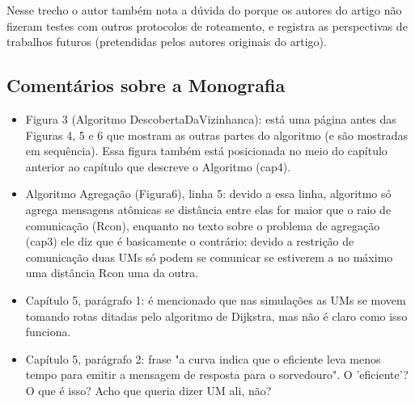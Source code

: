 Nesse trecho o autor também nota a dúvida do porque os autores do artigo não fizeram testes
com outros protocolos de roteamento, e registra as perspectivas de trabalhos futuros (pretendidas
pelos autores originais do artigo).

\subsection{Comentários sobre a Monografia}
\begin{itemize}
  \item Figura 3 (Algoritmo DescobertaDaVizinhanca): está uma página antes das Figuras 4, 5 e 6
que mostram as outras partes do algoritmo (e são mostradas em sequência). Essa figura
também está posicionada no meio do capítulo anterior ao capítulo que descreve o Algoritmo (cap4).

  \item Algoritmo Agregação (Figura6), linha 5: devido a essa linha, algoritmo só agrega mensagens
atômicas se distância entre elas for maior que o raio de comunicação (Rcon), enquanto no texto
sobre o problema de agregação (cap3) ele diz que é basicamente o contrário: devido a restrição de 
comunicação duas UMs só podem se comunicar se estiverem a no máximo uma distância Rcon uma da outra.

  \item Capítulo 5, parágrafo 1: é mencionado que nas simulações as UMs se movem tomando rotas ditadas
pelo algoritmo de Dijkstra, mas não é claro como isso funciona.

  \item Capítulo 5, parágrafo 2: frase "a curva indica que o eficiente leva menos tempo para emitir a
mensagem de resposta para o sorvedouro". O 'eficiente'? O que é isso? Acho que queria dizer UM ali, não?
\end{itemize}


